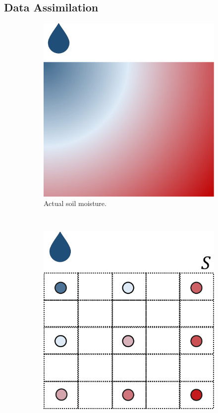 \subsection{Data Assimilation}\label{orchard-ssec:ass}

\begin{figure}[t]
\centering
\begin{subfigure}[t]{.3\textwidth}
\centering
\includegraphics[scale=.15]{chapters/physics-aware/orchard/img/soil-moisture-continuous.pdf}
\caption{Actual soil moisture.}
\label{orchard-fig:moisture-cont}
\end{subfigure}~
\begin{subfigure}[t]{.3\textwidth}
\centering
\includegraphics[scale=.15]{chapters/physics-aware/orchard/img/soil-moisture-sample.pdf}

\end{subfigure}
\end{figure}
